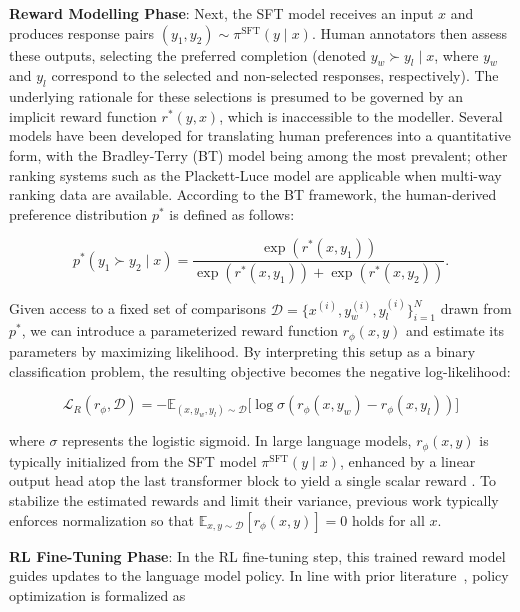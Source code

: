 \textbf{Reward Modelling Phase}: Next, the SFT model receives an input $x$ and produces response pairs $(y_1, y_2)\sim \pi^\text{SFT}(y \mid x)$. Human annotators then assess these outputs, selecting the preferred completion (denoted $y_w\succ y_l \mid x$, where $y_w$ and $y_l$ correspond to the selected and non-selected responses, respectively). The underlying rationale for these selections is presumed to be governed by an implicit reward function $r^*(y, x)$, which is inaccessible to the modeller. Several models have been developed for translating human preferences into a quantitative form, with the Bradley-Terry (BT) model \cite{bradley1952rankanalysis} being among the most prevalent; other ranking systems such as the Plackett-Luce model \citep{plackett1975analysis, luce2012individual} are applicable when multi-way ranking data are available. According to the BT framework, the human-derived preference distribution $p^*$ is defined as follows:

\begin{equation}\label{eq:bradley-terry}
    p^*(y_1\succ y_2 \mid x)=\frac{\exp\left(r^*(x, y_1)\right)}{\exp\left(r^*(x, y_1)\right) + \exp\left(r^*(x, y_2)\right)}.
\end{equation}

Given access to a fixed set of comparisons $\mathcal{D}=\bigl\{x^{(i)}, y_w^{(i)}, y_l^{(i)}\bigr\}_{i=1}^N$ drawn from $p^*$, we can introduce a parameterized reward function $r_{\phi}(x, y)$ and estimate its parameters by maximizing likelihood. By interpreting this setup as a binary classification problem, the resulting objective becomes the negative log-likelihood:

\begin{equation}\label{eq:reward_model}
    \mathcal{L}_R(r_{\phi}, \mathcal{D}) = -\mathbb{E}_{(x, y_w, y_l)\sim \mathcal{D}}\bigl[\log \sigma(r_{\phi}(x, y_w)- r_{\phi}(x, y_l))\bigr]
\end{equation}

where $\sigma$ represents the logistic sigmoid. In large language models, $r_{\phi}(x, y)$ is typically initialized from the SFT model $\pi^\text{SFT}(y \mid x)$, enhanced by a linear output head atop the last transformer block to yield a single scalar reward \cite{ziegler2020finetuning}. To stabilize the estimated rewards and limit their variance, previous work typically enforces normalization so that $\mathbb{E}_{x,y\sim \mathcal{D}}\left[r_\phi(x, y)\right] = 0$ holds for all $x$.

\textbf{RL Fine-Tuning Phase}: In the RL fine-tuning step, this trained reward model guides updates to the language model policy. In line with prior literature~\citep{jaques2017sequence, jaques2020human}, policy optimization is formalized as

